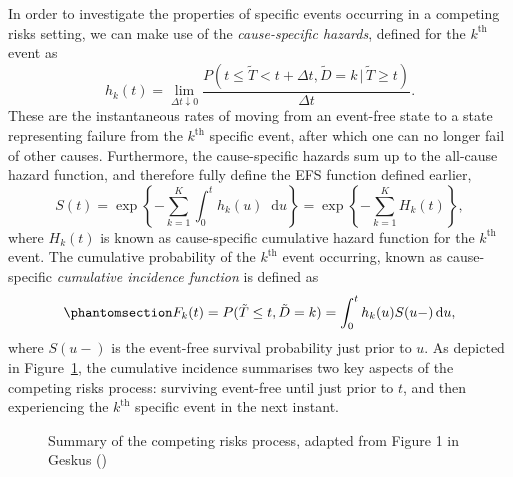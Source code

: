 \documentclass[
  letterpaper,
  paper=240mm:170mm,
  twoside=true,
  open=right,
  fontsize=10pt,
  pagesize=false,
  BCOR=15mm,
  DIV=14,
  headinclude=true,
  footinclude=false,
  headsepline=on]{scrbook}
\newcommand{\given}{\,|\,}
\newcommand\diff{\mathop{}\!\mathrm{d}}
\begin{document}
In order to investigate the properties of specific events occurring in a
competing risks setting, we can make use of the \emph{cause-specific
hazards}, defined for the \(k^{\text{th}}\) event as \[
h_k(t) = \lim_{\Delta t \downarrow 0} \frac{P(t \leq \tilde{T} < t + \Delta t, \tilde{D} = k \given \tilde{T} \geq t)}{\Delta t}.
\] These are the instantaneous rates of moving from an event-free state
to a state representing failure from the \(k^{\text{th}}\) specific
event, after which one can no longer fail of other causes. Furthermore,
the cause-specific hazards sum up to the all-cause hazard function, and
therefore fully define the EFS function defined earlier, \[
S(t) = \exp \left\{ - \sum_{k = 1}^{K} \int_{0}^{t} h_k(u)\diff u \right\} = \exp \left\{ - \sum_{k = 1}^{K} H_k(t) \right\},
\] where \(H_k(t)\) is known as cause-specific cumulative hazard
function for the \(k^{\text{th}}\) event. The cumulative probability of
the \(k^{\text{th}}\) event occurring, known as cause-specific
\emph{cumulative incidence function} is defined as
\begin{equation}\phantomsection\label{eq-cuminc-intro}{
    F_k(t) = P(\tilde{T} \leq t, \tilde{D} = k) = \int_{0}^{t}h_k(u)S(u-)\diff u,
}\end{equation} where \(S(u-)\) is the event-free survival probability
just prior to \(u\). As depicted in Figure~\ref{fig-diag-geskus}, the
cumulative incidence summarises two key aspects of the competing risks
process: surviving event-free until just prior to \(t\), and then
experiencing the \(k^{\text{th}}\) specific event in the next instant.

\begin{figure}


\caption{\label{fig-diag-geskus}Summary of the competing risks process,
adapted from Figure 1 in Geskus
()}

\end{figure}%
\end{document}
